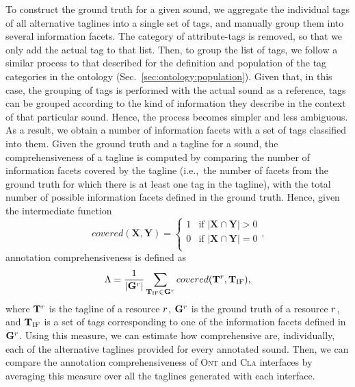 \begin{itemize}
To construct the ground truth for a given sound, we aggregate the individual tags of all alternative taglines into a single set of tags, and manually group them into several information facets. The category of attribute-tags is removed, so that we only add the actual tag to that list. Then, to group the list of tags, we follow a similar process to that described for the definition and population of the tag categories in the ontology (Sec.~\ref{sec:ontology:population}). Given that, in this case, the grouping of tags is performed with the actual sound as a reference, tags can be grouped according to the kind of information they describe in the context of that particular sound. Hence, the process becomes simpler and less ambiguous.
As a result, we obtain a number of information facets with a set of tags classified into them. 
Given the ground truth and a tagline for a sound, the comprehensiveness of a tagline is computed by comparing the number of information facets covered by the tagline (i.e.,~the number of facets from the ground truth for which there is at least one tag in the tagline), with the total number of possible information facets defined in the ground truth.
Hence, given the intermediate function
\[ covered(\mathbf{X},\mathbf{Y}) = \begin{cases} 
	1 & \text{if } |\mathbf{X} \cap \mathbf{Y}| > 0 \\
	0 & \text{if } |\mathbf{X} \cap \mathbf{Y}| = 0 \\
\end{cases}\text{,}\]
annotation comprehensiveness is defined as
\begin{equation} \Lambda = \frac{1}{|\mathbf{G}^r|}\sum\limits_{\mathbf{T}_\text{IF} \in \mathbf{G}^r}{covered(\mathbf{T}^r, \mathbf{T}_\text{IF})}
\text{,} 
\label{ontology:eq:annotation_comprehensiveness} \end{equation}
where $\mathbf{T}^r$ is the tagline of a resource $r$, $\mathbf{G}^r$ is the ground truth of a resource $r$, and $\mathbf{T}_\text{IF}$ is a set of tags corresponding to one of the information facets defined in $\mathbf{G}^r$.
Using this measure, we can estimate how comprehensive are, individually, each of the alternative taglines provided for every annotated sound. Then, we can compare the annotation comprehensiveness of \textsc{Ont} and \textsc{Cla} interfaces by averaging this measure over all the taglines generated with each interface.


\end{itemize}
